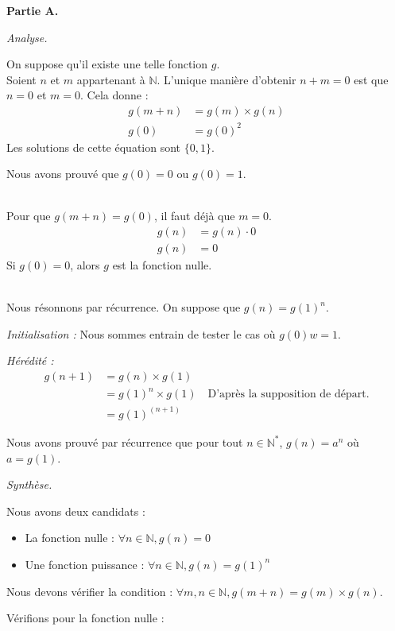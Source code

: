 \documentclass[]{../templates/homework}
\begin{document}
\textbf{Partie A.}

\subproblem
\textit{Analyse.}

On suppose qu'il existe une telle fonction $g$.
\question \\
Soient $n$ et $m$ appartenant à $\mathbb{N}$. L'unique manière d'obtenir $n + m = 0$ est que $n = 0$ et $m = 0$.
Cela donne :
\begin{align*}
	g(m + n) & = g(m) \times g(n) \\
	g(0)     & = g(0)^2
\end{align*}
Les solutions de cette équation sont $\{0, 1\}$.

Nous avons prouvé que $g(0) = 0$ ou $g(0) = 1$.

\question \\
Pour que $g(m + n) = g(0)$, il faut déjà que $m = 0$.
\begin{align*}
	g(n) & = g(n) \cdot 0 \\
	g(n) & = 0
\end{align*}
Si $g(0) = 0$, alors $g$ est la fonction nulle.

\question \\
Nous résonnons par récurrence. On suppose que $g(n) = g(1)^n$.

\textit{Initialisation :}
Nous sommes entrain de tester le cas où $g(0)w = 1$.

\textit{Hérédité :}
\begin{align*}
	g(n + 1) &= g(n) \times g(1) \\
	&= g(1)^n \times g(1) \quad \text{D'après la supposition de départ.} \\
	&= g(1)^{(n + 1)}
\end{align*}

Nous avons prouvé par récurrence que pour tout $n \in \mathbb{N^*}$, $g(n) = a^n$ où $a=g(1)$.

\subproblem
\textit{Synthèse.}

Nous avons deux candidats :
\begin{itemize}
	\item La fonction nulle : $\forall n \in \mathbb{N}, g(n) = 0$
	\item Une fonction puissance : $\forall n \in \mathbb{N}, g(n) = g(1)^n$
\end{itemize}
Nous devons vérifier la condition : $\forall m, n \in \mathbb{N}, g(m + n) = g(m) \times g(n)$.

Vérifions pour la fonction nulle :
\end{document}

